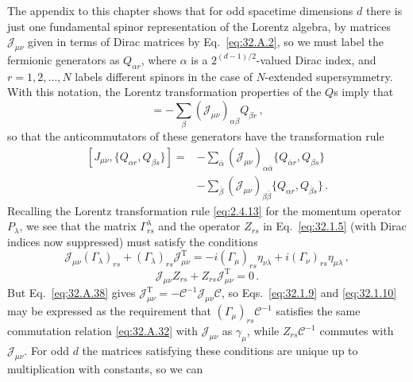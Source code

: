 The appendix to this chapter shows that for odd spacetime dimensions \(d\)
there is just one fundamental spinor representation of the Lorentz algebra,
by matrices \(\mathcal J_{\mu\nu}\) given in terms of Dirac matrices by
Eq.~\eqref{eq:32.A.2}, so we must label the fermionic generators as
\(Q_{\alpha r}\), where \(\alpha\) is a \(2^{(d-1)/2}\)-valued Dirac
index, and \(r=1,2,\ldots,N\) labels different spinors in the case of
\(N\)-extended supersymmetry. With this notation, the Lorentz transformation
properties of the \(Q\)s imply that
\begin{equation}
  [J_{\mu\nu},Q_{\alpha r}]
  =-\sum_\beta(\mathcal J_{\mu\nu})_{\alpha\beta}Q_{\beta r}\,,
  \tag{32.1.8}\label{eq:32.1.8}
\end{equation}
so that the anticommutators of these generators have the transformation rule
\[
  \begin{aligned}
  [J_{\mu\nu},\{Q_{\alpha r},Q_{\beta s}\}]
  ={}&-\sum_{\bar\alpha}
    (\mathcal J_{\mu\nu})_{\alpha\bar\alpha}
    \{Q_{\bar\alpha r},Q_{\beta s}\}
  \\
  &-\sum_{\bar\beta}
    (\mathcal J_{\mu\nu})_{\beta\bar\beta}
    \{Q_{\alpha r},Q_{\bar\beta s}\}\,.
  \end{aligned}
\]
Recalling the Lorentz transformation rule \eqref{eq:2.4.13} for the
momentum operator \(P_\lambda\), we see that the matrix
\(\Gamma^\lambda_{rs}\) and the operator \(Z_{rs}\) in
Eq.~\eqref{eq:32.1.5} (with Dirac indices now suppressed) must satisfy the
conditions
\begin{equation}
  \mathcal J_{\mu\nu}(\Gamma_\lambda)_{rs}
  +(\Gamma_\lambda)_{rs}\mathcal J_{\mu\nu}^{\mathrm T}
  =-i(\Gamma_\mu)_{rs}\eta_{\nu\lambda}
   +i(\Gamma_\nu)_{rs}\eta_{\mu\lambda}\,,
  \tag{32.1.9}\label{eq:32.1.9}
\end{equation}
\begin{equation}
  \mathcal J_{\mu\nu}Z_{rs}
  +Z_{rs}\mathcal J_{\mu\nu}^{\mathrm T}=0\,.
  \tag{32.1.10}\label{eq:32.1.10}
\end{equation}
But Eq.~\eqref{eq:32.A.38} gives
\(\mathcal J_{\mu\nu}^{\mathrm T}
=-\mathcal C^{-1}\mathcal J_{\mu\nu}\mathcal C\), so
Eqs.~\eqref{eq:32.1.9} and \eqref{eq:32.1.10} may be expressed as the
requirement that \((\Gamma_\mu)_{rs}\mathcal C^{-1}\) satisfies the same
commutation relation \eqref{eq:32.A.32} with \(\mathcal J_{\mu\nu}\) as
\(\gamma_\mu\), while \(Z_{rs}\mathcal C^{-1}\) commutes with
\(\mathcal J_{\mu\nu}\). For odd \(d\) the matrices satisfying these
conditions are unique up to multiplication with constants, so we can
